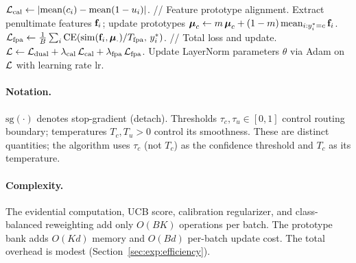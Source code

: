 \begin{algorithm}[t]
\begin{algorithmic}[1]
  \State $\mathcal{L}_\mathrm{cal} \leftarrow |\mathrm{mean}(c_i) - \mathrm{mean}(1 - u_i)|$.
  \State // Feature prototype alignment.
  \State Extract penultimate features $\mathbf{f}_i$; update prototypes $\boldsymbol{\mu}_c \leftarrow m\,\boldsymbol{\mu}_c + (1-m)\,\mathrm{mean}_{i:y_i^*=c}\,\mathbf{f}_i$.
  \State $\mathcal{L}_\mathrm{fpa} \leftarrow \frac{1}{B}\sum_i \mathrm{CE}(\mathrm{sim}(\mathbf{f}_i, \boldsymbol{\mu}_\cdot)/T_\mathrm{fpa},\, y_i^*)$.
  \State // Total loss and update.
  \State $\mathcal{L} \leftarrow \mathcal{L}_\mathrm{dual} + \lambda_\mathrm{cal}\,\mathcal{L}_\mathrm{cal} + \lambda_\mathrm{fpa}\,\mathcal{L}_\mathrm{fpa}$.
  \State Update LayerNorm parameters $\theta$ via Adam on $\mathcal{L}$ with learning rate $\mathrm{lr}$.
\EndFor
\end{algorithmic}
\end{algorithm}

\paragraph{Notation.}
$\mathrm{sg}(\cdot)$ denotes stop-gradient (detach). Thresholds $\tau_c, \tau_u \in [0,1]$ control routing boundary; temperatures $T_c, T_u > 0$ control its smoothness. These are distinct quantities; the algorithm uses $\tau_c$ (not $T_c$) as the confidence threshold and $T_c$ as its temperature.

\paragraph{Complexity.}
The evidential computation, UCB score, calibration regularizer, and class-balanced reweighting add only $O(BK)$ operations per batch. The prototype bank adds $O(Kd)$ memory and $O(Bd)$ per-batch update cost. The total overhead is modest (Section~\ref{sec:exp:efficiency}).

